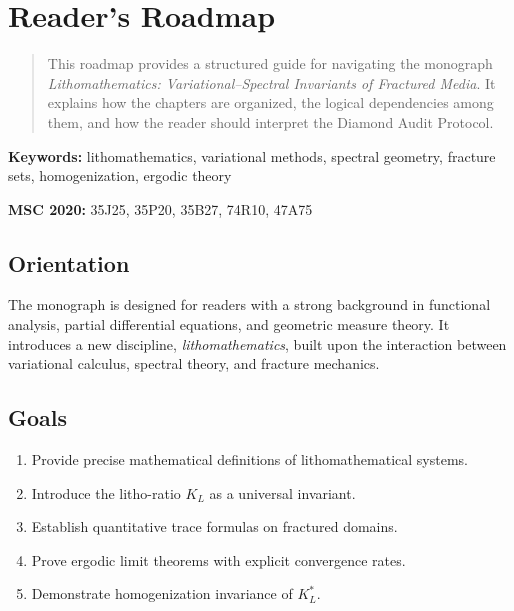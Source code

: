 
\chapter*{Reader's Roadmap}

\begin{abstract}
This roadmap provides a structured guide for navigating the monograph
\emph{Lithomathematics: Variational--Spectral Invariants of Fractured Media}.
It explains how the chapters are organized, the logical dependencies among them,
and how the reader should interpret the Diamond Audit Protocol.
\end{abstract}

\noindent\textbf{Keywords:} lithomathematics, variational methods, spectral geometry, fracture sets, homogenization, ergodic theory

\noindent\textbf{MSC 2020:} 35J25, 35P20, 35B27, 74R10, 47A75

\section*{Orientation}
The monograph is designed for readers with a strong background in
functional analysis, partial differential equations, and geometric measure theory.
It introduces a new discipline, \emph{lithomathematics}, built upon the interaction
between variational calculus, spectral theory, and fracture mechanics.

\section*{Goals}
\begin{enumerate}[label=G\arabic*.]
  \item Provide precise mathematical definitions of lithomathematical systems.
  \item Introduce the litho-ratio $K_L$ as a universal invariant.
  \item Establish quantitative trace formulas on fractured domains.
  \item Prove ergodic limit theorems with explicit convergence rates.
  \item Demonstrate homogenization invariance of $K_L^*$.
\end{enumerate}

